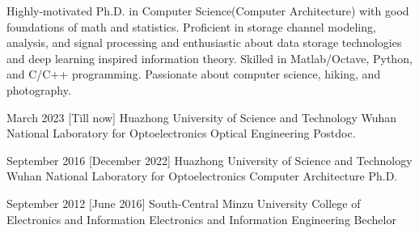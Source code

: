 \documentclass{resume}
\begin{document}
\makeheader

Highly-motivated Ph.D. in Computer Science(Computer Architecture)
with good foundations of math and statistics.
Proficient in storage channel modeling, analysis, and signal processing
and enthusiastic about data storage technologies and deep learning inspired information theory.
Skilled in Matlab/Octave, Python, and C/C++ programming.
Passionate about computer science, hiking, and photography.


\begin{educations}
  \education%
  {March 2023}%
    [Till now]%
    {Huazhong University of Science and Technology}%
    {Wuhan National Laboratory for Optoelectronics}%
    {Optical Engineering}%
    {Postdoc.}

  \separator{0.5ex}
  \education%
    {September 2016}%
    [December 2022]%
    {Huazhong University of Science and Technology}%
    {Wuhan National Laboratory for Optoelectronics}%
    {Computer Architecture}%
    {Ph.D.}

    \separator{0.5ex}
  \education%
    {September 2012}%
    [June 2016]%
    {South-Central Minzu University}%
    {College of Electronics and Information}%
    {Electronics and Information Engineering}%
    {Bechelor}

\end{educations}
\end{document}
